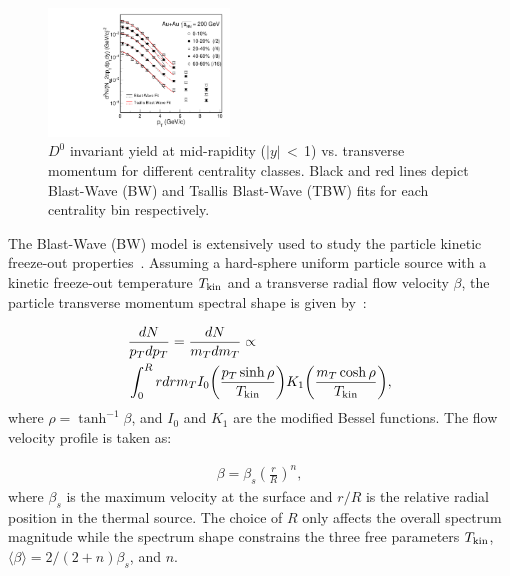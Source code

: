 \documentclass[%
 reprint,	
 amsmath,amssymb,
 aps,
 prc,
]{revtex4-1}
\begin{document}
\begin{figure}
\centering
\includegraphics[width=0.43\textwidth]{fig/BWFit.pdf}
\caption{$D^{0}$ invariant yield at mid-rapidity ($|y|$\,$<$\,1) vs. transverse momentum for different centrality classes. Black and red lines depict Blast-Wave (BW) and Tsallis Blast-Wave (TBW) fits for each centrality bin respectively.}
\label{fig:BWFit} 
\end{figure}

The Blast-Wave (BW) model is extensively used to study the particle kinetic freeze-out properties~\cite{Adams:2003xp,Adamczyk:2017iwn}. Assuming a hard-sphere uniform particle source with a kinetic freeze-out temperature $T_{\rm kin}$ and a transverse radial flow velocity $\beta$, the particle transverse momentum spectral shape is given by~\cite{Schnedermann:1993ws}:

\begin{equation}
  \begin{aligned}
  & \frac{dN}{p_{T}dp_{T}} = \frac{dN}{m_{T}dm_{T}} \propto \\
  & \int_0^R rdr m_{T} I_0\bigg(\frac{p_{T}\sinh\rho}{T_{\rm kin}}\bigg) K_1\bigg(\frac{m_{T}\cosh\rho}{T_{\rm kin}}\bigg),
  \end{aligned}
\label{equ:equation8}
\end{equation}
where $\rho = \tanh^{-1}\beta$, and $I_0$ and $K_1$ are the modified Bessel functions. The flow velocity profile is taken as:

\begin{equation}
  \begin{aligned}
    \beta = \beta_{s}\left(\frac{r}{R}\right)^{n},
  \end{aligned}
\label{equ:equation9}
\end{equation}
where $\beta_{s}$ is the maximum velocity at the surface and $r/R$ is the relative radial position in the thermal source. The choice of $R$ only affects the overall spectrum magnitude while the spectrum shape constrains the three free parameters $T_{\rm kin}$, $\langle\beta\rangle=2/(2+n)\beta_{s}$, and $n$.
\end{document}

